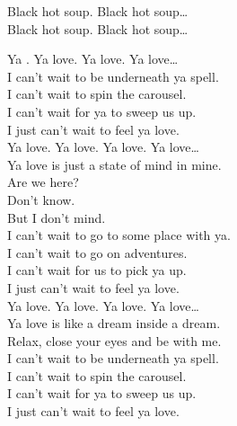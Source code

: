 Black hot soup. Black hot soup… \\
Black hot soup. Black hot soup… \\




Ya . Ya love. Ya love. Ya love… \\

I can't wait to be underneath ya spell. \\
I can't wait to spin the carousel. \\
I can't wait for ya to sweep us up. \\
I just can't wait to feel ya love. \\

Ya love. Ya love. Ya love. Ya love… \\

Ya love is just a state of mind in mine. \\
Are we here? \\
Don't know. \\
But I don't mind. \\

I can't wait to go to some place with ya. \\
I can't wait to go on adventures. \\
I can't wait for us to pick ya up. \\
I just can't wait to feel ya love. \\

Ya love. Ya love. Ya love. Ya love… \\

Ya love is like a dream inside a dream. \\
Relax, close your eyes and be with me. \\

I can't wait to be underneath ya spell. \\
I can't wait to spin the carousel. \\
I can't wait for ya to sweep us up. \\
I just can't wait to feel ya love. \\




